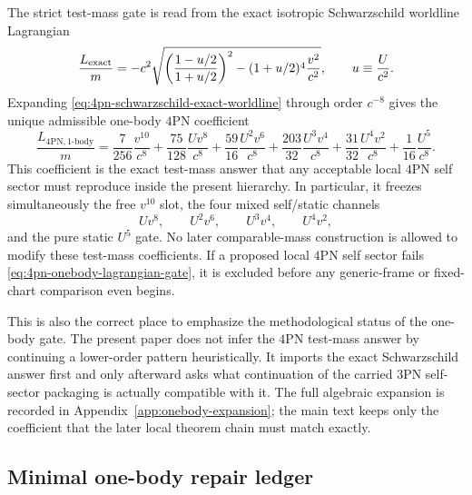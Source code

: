 \documentclass[11pt]{article}
\begin{document}
The strict test-mass gate is read from the exact isotropic Schwarzschild
worldline Lagrangian
\begin{equation}
\frac{L_{\rm exact}}{m}
=
-c^2\sqrt{\left(\frac{1-u/2}{1+u/2}\right)^2-(1+u/2)^4\frac{v^2}{c^2}},
\qquad
u\equiv \frac{U}{c^2}.
\label{eq:4pn-schwarzschild-exact-worldline}
\end{equation}
Expanding \eqref{eq:4pn-schwarzschild-exact-worldline} through order $c^{-8}$
gives the unique admissible one-body $4$PN coefficient
\begin{equation}
\frac{L_{4\mathrm{PN},1\text{-body}}}{m}
=
\frac{7}{256}\frac{v^{10}}{c^8}
+\frac{75}{128}\frac{Uv^8}{c^8}
+\frac{59}{16}\frac{U^2v^6}{c^8}
+\frac{203}{32}\frac{U^3v^4}{c^8}
+\frac{31}{32}\frac{U^4v^2}{c^8}
+\frac{1}{16}\frac{U^5}{c^8}.
\label{eq:4pn-onebody-lagrangian-gate}
\end{equation}
This coefficient is the exact test-mass answer that any acceptable local
$4$PN self sector must reproduce inside the present hierarchy.  In particular,
it freezes simultaneously the free $v^{10}$ slot, the four mixed
self/static channels
\[
Uv^8,
\qquad
U^2v^6,
\qquad
U^3v^4,
\qquad
U^4v^2,
\]
and the pure static $U^5$ gate.  No later comparable-mass construction is
allowed to modify these test-mass coefficients.  If a proposed local $4$PN
self sector fails \eqref{eq:4pn-onebody-lagrangian-gate}, it is excluded
before any generic-frame or fixed-chart comparison even begins.

This is also the correct place to emphasize the methodological status of the
one-body gate.  The present paper does not infer the $4$PN test-mass answer by
continuing a lower-order pattern heuristically.  It imports the exact
Schwarzschild answer first and only afterward asks what continuation of the
carried $3$PN self-sector packaging is actually compatible with it.  The full
algebraic expansion is recorded in Appendix~\ref{app:onebody-expansion}; the
main text keeps only the coefficient that the later local theorem chain must
match exactly.

\subsection{Minimal one-body repair ledger}
\label{sec:onebody-repair}
\end{document}

